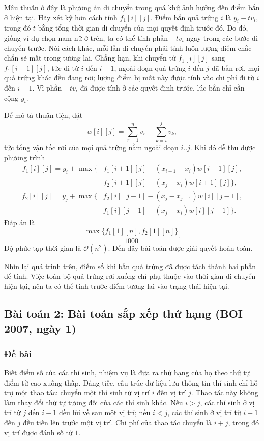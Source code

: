 \documentclass[11pt]{article}
\newcommand{\Oh}{\mathcal{O}}
\begin{document}
Mâu thuẫn ở đây là phương án di chuyển trong quá khứ ảnh hưởng đến điểm bắn ở
hiện tại. Hãy xét kỹ hơn cách tính $f_1[i][j]$. Điểm bắn quả trứng $i$ là
$y_i-t v_i$, trong đó $t$ bằng tổng thời gian di chuyển của mọi quyết định
trước đó. Do đó, giống ví dụ chọn nam nữ ở trên, ta có thể tính phần $-t v_i$
ngay trong các bước di chuyển trước. Nói cách khác, mỗi lần di chuyển phải
tính luôn lượng điểm chắc chắn sẽ mất trong tương lai. Chẳng hạn, khi chuyển
từ $f_1[i][j]$ sang $f_1[i-1][j]$, tức đi từ $i$ đến $i-1$, ngoài đoạn quả
trứng $i$ đến $j$ đã bắn rơi, mọi quả trứng khác đều đang rơi; lượng điểm bị
mất này được tính vào chi phí đi từ $i$ đến $i-1$. Vì phần $-t v_i$ đã được
tính ở các quyết định trước, lúc bắn chỉ cần cộng $y_i$.

Để mô tả thuận tiện, đặt
\[
  w[i][j]=\sum_{r=1}^{n} v_r-\sum_{k=i}^{j} v_k,
\]
tức tổng vận tốc rơi của mọi quả trứng nằm ngoài đoạn $i..j$. Khi đó dễ thu
được phương trình
\[
\begin{aligned}
f_1[i][j] = y_i+\max\{&
  f_1[i+1][j]-(x_{i+1}-x_i)w[i+1][j],\\
& f_2[i+1][j]-(x_j-x_i)w[i+1][j]\},
\end{aligned}
\]
\[
\begin{aligned}
f_2[i][j] = y_j+\max\{&
  f_2[i][j-1]-(x_j-x_{j-1})w[i][j-1],\\
& f_1[i][j-1]-(x_j-x_i)w[i][j-1]\}.
\end{aligned}
\]
Đáp án là
\[
  \frac{\max\{f_1[1][n],f_2[1][n]\}}{1000}.
\]
Độ phức tạp thời gian là $\Oh(n^2)$. Đến đây bài toán được giải quyết hoàn
toàn.

Nhìn lại quá trình trên, điểm số khi bắn quả trứng đã được tách thành hai phần
để tính. Việc toàn bộ quả trứng rơi xuống chỉ phụ thuộc vào thời gian di
chuyển hiện tại, nên ta có thể tính trước điểm tương lai vào trạng thái hiện
tại.

\subsection{Bài toán 2: Bài toán sắp xếp thứ hạng (BOI 2007, ngày 1)}

\subsubsection*{Đề bài}

Biết điểm số của các thí sinh, nhiệm vụ là đưa ra thứ hạng của họ theo thứ tự
điểm từ cao xuống thấp. Đáng tiếc, cấu trúc dữ liệu lưu thông tin thí sinh chỉ
hỗ trợ một thao tác: chuyển một thí sinh từ vị trí $i$ đến vị trí $j$. Thao
tác này không làm thay đổi thứ tự tương đối của các thí sinh khác. Nếu
$i>j$, các thí sinh ở vị trí từ $j$ đến $i-1$ đều lùi về sau một vị trí; nếu
$i<j$, các thí sinh ở vị trí từ $i+1$ đến $j$ đều tiến lên trước một vị trí.
Chi phí của thao tác chuyển là $i+j$, trong đó vị trí được đánh số từ $1$.
\end{document}
